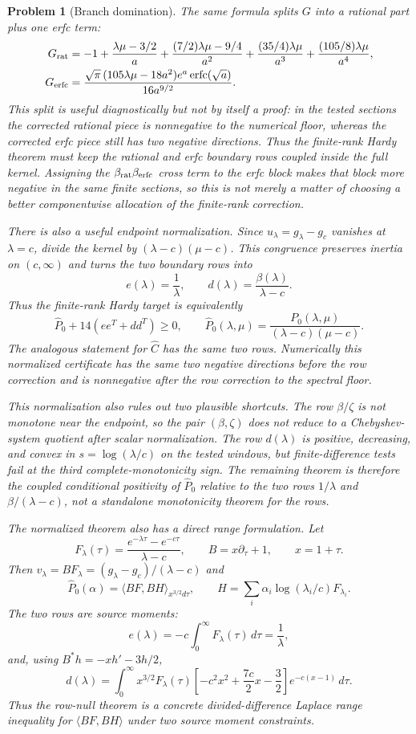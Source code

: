\documentclass[11pt]{article}
\newtheorem{problem}[theorem]{Problem}
\begin{document}
\begin{problem}[Branch domination]
The same formula splits $G$ into a rational part plus one erfc term:
\[
\begin{aligned}
  G_{\rm rat}
  &=-1+\frac{\lambda\mu-3/2}{a}
    +\frac{(7/2)\lambda\mu-9/4}{a^2}
    +\frac{(35/4)\lambda\mu}{a^3}
    +\frac{(105/8)\lambda\mu}{a^4},\\
  G_{\rm erfc}
  &=
  \frac{\sqrt\pi\,(105\lambda\mu-18a^2)e^a
  \operatorname{erfc}(\sqrt a)}{16a^{9/2}}.
\end{aligned}
\]
This split is useful diagnostically but not by itself a proof: in the tested
sections the corrected rational piece is nonnegative to the numerical floor,
whereas the corrected erfc piece still has two negative directions.  Thus the
finite-rank Hardy theorem must keep the rational and erfc boundary rows coupled
inside the full kernel.  Assigning the $\beta_{\rm rat}\beta_{\rm erfc}$ cross
term to the erfc block makes that block more negative in the same finite
sections, so this is not merely a matter of choosing a better componentwise
allocation of the finite-rank correction.

There is also a useful endpoint normalization.  Since $u_\lambda=g_\lambda-g_c$
vanishes at $\lambda=c$, divide the kernel by $(\lambda-c)(\mu-c)$.  This
congruence preserves inertia on $(c,\infty)$ and turns the two boundary rows
into
\[
  e(\lambda)=\frac1\lambda,\qquad
  d(\lambda)=\frac{\beta(\lambda)}{\lambda-c}.
\]
Thus the finite-rank Hardy target is equivalently
\[
  \widehat P_0+14(ee^T+dd^T)\ge0,\qquad
  \widehat P_0(\lambda,\mu)
  =\frac{P_0(\lambda,\mu)}{(\lambda-c)(\mu-c)}.
\]
The analogous statement for $\widehat C$ has the same two rows.  Numerically
this normalized certificate has the same two negative directions before the
row correction and is nonnegative after the row correction to the spectral
floor.

This normalization also rules out two plausible shortcuts.  The row
$\beta/\zeta$ is not monotone near the endpoint, so the pair $(\beta,\zeta)$
does not reduce to a Chebyshev-system quotient after scalar normalization.
The row $d(\lambda)$ is positive, decreasing, and convex in
$s=\log(\lambda/c)$ on the tested windows, but finite-difference tests fail at
the third complete-monotonicity sign.  The remaining theorem is therefore the
coupled conditional positivity of $\widehat P_0$ relative to the two rows
$1/\lambda$ and $\beta/(\lambda-c)$, not a standalone monotonicity theorem for
the rows.

The normalized theorem also has a direct range formulation.  Let
\[
  F_\lambda(\tau)=\frac{e^{-\lambda\tau}-e^{-c\tau}}{\lambda-c},
  \qquad B=x\partial_\tau+1,\qquad x=1+\tau .
\]
Then $v_\lambda=BF_\lambda=(g_\lambda-g_c)/(\lambda-c)$ and
\[
  \widehat P_0(\alpha)
  =\langle BF,BH\rangle_{x^{3/2}d\tau},\qquad
  H=\sum_i \alpha_i\log(\lambda_i/c)F_{\lambda_i}.
\]
The two rows are source moments:
\[
  e(\lambda)=-c\int_0^\infty F_\lambda(\tau)\,d\tau=\frac1\lambda,
\]
and, using $B^*h=-xh'-3h/2$,
\[
  d(\lambda)=
  \int_0^\infty x^{3/2}F_\lambda(\tau)
  \left[-c^2x^2+\frac{7c}{2}x-\frac32\right]e^{-c(x-1)}\,d\tau .
\]
Thus the row-null theorem is a concrete divided-difference Laplace range
inequality for $\langle BF,BH\rangle$ under two source moment constraints.


\end{problem}
\end{document}
